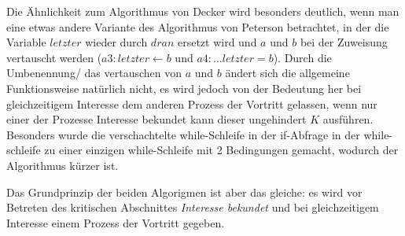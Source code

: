 \documentclass[a4paper,twoside,12pt,fleqn]{article}
\begin{document}
\begin{description}
	Die Ähnlichkeit zum Algorithmus von Decker wird besonders deutlich, wenn man
	eine etwas andere Variante des Algorithmus von Peterson betrachtet, in der
	die Variable $letzter$ wieder durch $dran$ ersetzt wird und $a$ und $b$ bei der
	Zuweisung vertauscht werden ($a3: letzter \leftarrow b$ und
	$a4: \dots letzter = b$). Durch die Umbenennung/ das vertauschen von $a$ und $b$
	ändert sich die allgemeine Funktionsweise natürlich nicht, es wird jedoch von
	der Bedeutung her bei gleichzeitigem Interesse dem anderen Prozess der Vortritt
	gelassen, wenn nur einer der Prozesse Interesse bekundet kann dieser ungehindert
	$K$ ausführen. Besonders wurde die verschachtelte while-Schleife in der if-Abfrage
	in der while-schleife zu einer einzigen while-Schleife mit 2 Bedingungen gemacht,
	wodurch der Algorithmus kürzer ist.

	Das Grundprinzip der beiden Algorigmen ist aber das gleiche: es wird vor
	Betreten des kritischen Abschnittes \emph{Interesse bekundet} und bei gleichzeitigem
	Interesse einem Prozess der Vortritt gegeben.
\end{description}
\end{document}
